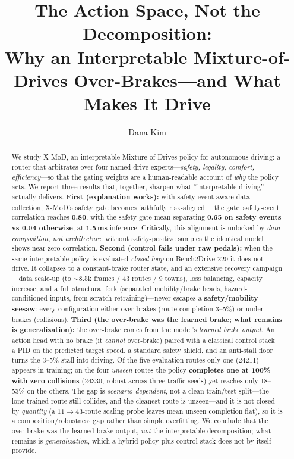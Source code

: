\documentclass[10pt]{article}
\title{\textbf{The Action Space, Not the Decomposition:\\
Why an Interpretable Mixture-of-Drives Over-Brakes---and What Makes It Drive}}
\author{Dana Kim}
\date{}
\begin{document}
\maketitle

\begin{abstract}
We study X-MoD, an interpretable Mixture-of-Drives policy for autonomous driving: a router that
arbitrates over four named drive-experts---\emph{safety, legality, comfort, efficiency}---so that the
gating weights are a human-readable account of \emph{why} the policy acts. We report three results that,
together, sharpen what ``interpretable driving'' actually delivers. \textbf{First (explanation
works):} with safety-event-aware data collection, X-MoD's safety gate becomes faithfully risk-aligned
---the gate--safety-event correlation reaches \textbf{0.80}, with the safety gate mean separating
\textbf{0.65 on safety events vs 0.04 otherwise}, at \textbf{1.5\,ms} inference. Critically, this
alignment is unlocked by \emph{data composition, not architecture}: without safety-positive samples
the identical model shows near-zero correlation. \textbf{Second (control fails under raw pedals):} when the same
interpretable policy is evaluated \emph{closed-loop} on Bench2Drive-220 it does not drive. It
collapses to a constant-brake router state, and an extensive recovery campaign---data scale-up (to
$\sim$8.5k frames / 43 routes / 9 towns), loss balancing, capacity increase, and a full structural
fork (separated mobility/brake heads, hazard-conditioned inputs, from-scratch retraining)---never
escapes a \textbf{safety/mobility seesaw}: every configuration either over-brakes (route completion
3--5\%) or under-brakes (collisions). \textbf{Third (the over-brake was the learned brake; what remains is generalization):}
the over-brake comes from the model's \emph{learned brake output}. An action head with no brake (it
\emph{cannot} over-brake) paired with a classical control stack---a PID on the predicted target speed,
a standard safety shield, and an anti-stall floor---turns the 3--5\% stall into driving. Of the five
evaluation routes only one (24211) appears in training; on the four \emph{unseen} routes the policy
\textbf{completes one at 100\% with zero collisions} (24330, robust across three traffic seeds) yet
reaches only 18--53\% on the others. The gap is \emph{scenario-dependent}, not a clean train/test
split---the lone trained route still collides, and the cleanest route is unseen---and it is not closed
by \emph{quantity} (a $11\rightarrow43$-route scaling probe leaves mean unseen completion flat), so it
is a composition/robustness gap rather than simple overfitting. We conclude that the over-brake was the learned brake output, \emph{not} the
interpretable decomposition; what remains is \emph{generalization}, which a hybrid
policy-plus-control-stack does not by itself provide.
\end{abstract}
\end{document}
